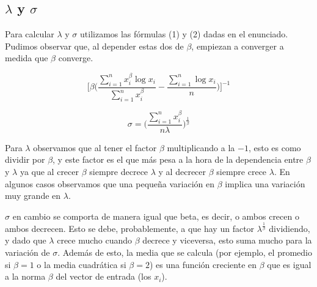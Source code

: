 
\subsection{$\lambda$ y $\sigma$}

\indent Para calcular $\lambda$ y $\sigma$ utilizamos las f\'ormulas (1) y (2) dadas en el enunciado. Pudimos observar que, al depender estas dos de $\beta$, empiezan a converger a medida que $\beta$ converge.

$$\big[ \beta \big( \frac{\sum_{i=1}^{n}x_i^\beta \log x_i}{ \sum_{i=1}^{n} x_i^\beta} - \frac{\sum_{i=1}^{n} \log x_i}{n} \big)\big]^{-1}$$

$$\sigma = \big( \frac{\sum_{i=1}^{n} x_i^\beta}{n\lambda}\big)^{\frac{1}{\beta}}$$

Para $\lambda$ observamos que al tener el factor $\beta$ multiplicando a la $-1$, esto es como dividir por $\beta$, y este factor es el que m\'as pesa a la hora de la dependencia entre $\beta$ y $\lambda$ ya que al crecer $\beta$ siempre decrece $\lambda$ y al decrecer $\beta$ siempre crece $\lambda$. En algunos casos observamos que una peque\~na variaci\'on en $\beta$ implica una variaci\'on muy grande en $\lambda$.

$\sigma$ en cambio se comporta de manera igual que beta, es decir, o ambos crecen o ambos decrecen. Esto se debe, probablemente, a que hay un factor $\lambda^{\frac{1}{\beta}}$ dividiendo, y dado que $\lambda$ crece mucho cuando $\beta$ decrece y viceversa, esto suma mucho para la variaci\'on de $\sigma$. Adem\'as de esto, la media que se calcula (por ejemplo, el promedio si $\beta = 1$ o la media cuadr\'atica si $\beta = 2$) es una funci\'on creciente en $\beta$ que es igual a la norma $\beta$ del vector de entrada (los $x_i$).
